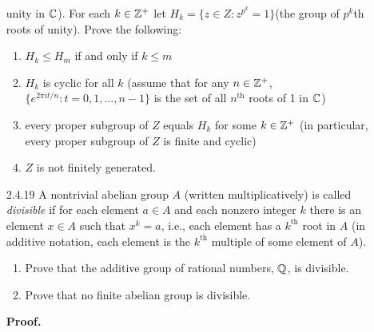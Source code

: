 \begin{enumerate}
                  unity in $\mathbb{C}$). For each $k \in \mathbb{Z}^+$ let
                  $H_k = \{z \in Z : z^{p^k} = 1\}$(the group of $p^k$th roots
                  of unity). Prove the following:
                  \begin{enumerate}
                     \item $H_k \le H_m$ if and only if $k \le m$
                     \item $H_k$ is cyclic for all $k$ (assume that for any
                           $n \in \mathbb{Z}^+$, $\{e^{2\pi it/n}:t =0,1,\ldots, n-1\}$
                           is the set of all $n^{\text{th}}$ roots of 1 in
                           $\mathbb{C}$)
                     \item every proper subgroup of $Z$ equals $H_k$ for some
                           $k \in \mathbb{Z}^+$ (in particular, every proper subgroup of
                           $Z$ is finite and cyclic)
                     \item $Z$ is not finitely generated.
                  \end{enumerate}
   \item[2.4.19]  A nontrivial abelian group $A$ (written multiplicatively) is
                  called \textit{divisible} if for each element $a \in A$ and
                  each nonzero integer $k$ there is an element $x \in A$ such
                  that $x^k = a$, i.e., each element has a $k^{\text{th}}$ root
                  in $A$ (in additive notation, each element is the
                  $k^{\text{th}}$ multiple of some element of $A$).
                  \begin{enumerate}
                     \item Prove that the additive group of rational numbers,
                           $\mathbb{Q}$, is divisible.
                     \item Prove that no finite abelian group is divisible.
                  \end{enumerate}
                  
      \textbf{Proof.}
      

\end{enumerate}
